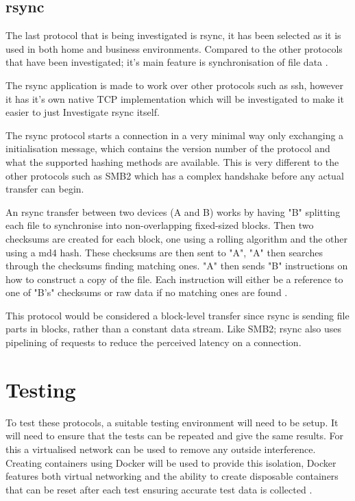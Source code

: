 \subsection*{rsync}
The last protocol that is being investigated is rsync, it has been selected as it is used in both home and business environments. Compared to the other protocols that have been investigated; it's main feature is synchronisation of file data \parencite{rsync-samba}.

The rsync application is made to work over other protocols such as ssh, however it has it's own native TCP implementation which will be investigated to make it easier to just Investigate rsync itself.

The rsync protocol starts a connection in a very minimal way only exchanging a initialisation message, which contains the version number of the protocol and what the supported hashing methods are available. This is very different to the other protocols such as SMB2 which has a complex handshake before any actual transfer can begin.

An rsync transfer between two devices (A and B) works by having "B" splitting each file to synchronise into non-overlapping fixed-sized blocks. Then two checksums are created for each block, one using a rolling algorithm and the other using a md4 hash. These checksums are then sent to "A", "A" then searches through the checksums finding matching ones. "A" then sends "B" instructions on how to construct a copy of the file. Each instruction will either be a reference to one of "B's" checksums or raw data if no matching ones are found \parencite{tridgell1996rsync}.


This protocol would be considered a block-level transfer since rsync is sending file parts in blocks, rather than a constant data stream. Like SMB2; rsync also uses pipelining of requests to reduce the perceived latency on a connection.


\section{Testing}
To test these protocols, a suitable testing environment will need to be setup. It will need to ensure that the tests can be repeated and give the same results. For this a virtualised network can be used to remove any outside interference. Creating containers using Docker will be used to provide this isolation, Docker features both virtual networking and the ability to create disposable containers that can be reset after each test ensuring accurate test data is collected \parencite{matthias2015docker}.

